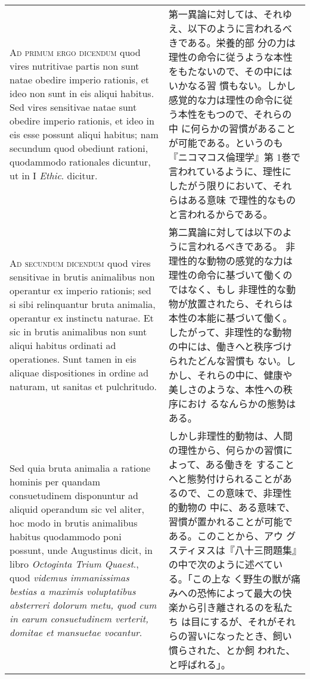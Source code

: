 \documentclass[10pt]{jsarticle} %
\begin{document}
\begin{longtable}{p{21em}p{21em}}
\\



{\scshape Ad primum ergo dicendum} quod vires nutritivae partis non sunt natae
 obedire imperio rationis, et ideo non sunt in eis aliqui habitus. Sed
 vires sensitivae natae sunt obedire imperio rationis, et ideo in eis
 esse possunt aliqui habitus; nam secundum quod obediunt rationi,
 quodammodo rationales dicuntur, ut in I {\itshape Ethic}. dicitur.

&

第一異論に対しては、それゆえ、以下のように言われるべきである。栄養的部
分の力は理性の命令に従うような本性をもたないので、その中にはいかなる習
慣もない。しかし感覚的な力は理性の命令に従う本性をもつので、それらの中
に何らかの習慣があることが可能である。というのも『ニコマコス倫理学』第
1巻で言われているように、理性にしたがう限りにおいて、それらはある意味
で理性的なものと言われるからである。

\\



{\scshape Ad secundum dicendum} quod vires sensitivae in brutis
animalibus non operantur ex imperio rationis; sed si sibi relinquantur
bruta animalia, operantur ex instinctu naturae. Et sic in brutis
animalibus non sunt aliqui habitus ordinati ad operationes. Sunt tamen
in eis aliquae dispositiones in ordine ad naturam, ut sanitas et
pulchritudo.


&

第二異論に対しては以下のように言われるべきである。
非理性的な動物の感覚的な力は理性の命令に基づいて働くのではなく、もし
非理性的な動物が放置されたら、それらは本性の本能に基づいて働く。
したがって、非理性的な動物の中には、働きへと秩序づけられたどんな習慣も
 ない。しかし、それらの中に、健康や美しさのような、本性への秩序におけ
 るなんらかの態勢はある。

\\

Sed quia bruta animalia a ratione hominis per quandam consuetudinem
disponuntur ad aliquid operandum sic vel aliter, hoc modo in brutis
animalibus habitus quodammodo poni possunt, unde Augustinus dicit, in
libro {\itshape Octoginta Trium Quaest}., quod {\itshape videmus
immanissimas bestias a maximis voluptatibus absterreri dolorum metu,
quod cum in earum consuetudinem verterit, domitae et mansuetae
vocantur}.


&

しかし非理性的動物は、人間の理性から、何らかの習慣によって、ある働きを
 することへと態勢付けられることがあるので、この意味で、非理性的動物の
 中に、ある意味で、習慣が置かれることが可能である。このことから、アウ
 グスティヌスは『八十三問題集』の中で次のように述べている。「この上な
 く野生の獣が痛みへの恐怖によって最大の快楽から引き離されるのを私たち
 は目にするが、それがそれらの習いになったとき、飼い慣らされた、とか飼
 われた、と呼ばれる」。



\end{longtable}
\end{document}
